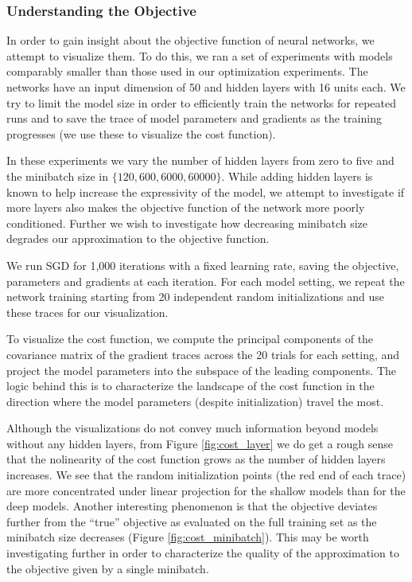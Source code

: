 \subsubsection*{Understanding the Objective}

In order to gain insight about the objective function of neural networks, we
attempt to visualize them. To do this, we ran a set of experiments with models
comparably smaller than those used in our optimization experiments.  The
networks have an input dimension of 50 and hidden layers with 16 units each. We
try to limit the model size in order to efficiently train the networks for
repeated runs and to save the trace of model parameters and gradients as the
training progresses (we use these to visualize the cost function).

In these experiments we vary the number of hidden layers from zero to five and
the minibatch size in $\{120,600,6000,60000\}$.  While adding hidden layers is
known to help increase the expressivity of the model, we attempt to investigate
if more layers also makes the objective function of the network more poorly
conditioned. Further we wish to investigate how decreasing minibatch size degrades
our approximation to the objective function.

We run SGD for 1,000 iterations with a fixed learning rate, saving the
objective, parameters and gradients at each iteration. For each model setting,
we repeat the network training starting from 20 independent random initializations and
use these traces for our visualization.

To visualize the cost function, we compute the principal components of the
covariance matrix of the gradient traces across the 20 trials for each setting,
and project the model parameters into the subspace of the leading components.
The logic behind this is to characterize the landscape of the cost function in
the direction where the model parameters (despite initialization) travel the
most. 

Although the visualizations do not convey much information beyond models
without any hidden layers, from Figure \ref{fig:cost_layer} we do get a rough
sense that the nolinearity of the cost function grows as the number of hidden
layers increases. We see that the random initialization points (the red end of
each trace) are more concentrated under linear projection for the shallow
models than for the deep models. Another interesting phenomenon is that the
objective deviates further from the ``true'' objective as evaluated on the full
training set as the minibatch size decreases (Figure \ref{fig:cost_minibatch}).
This may be worth investigating further in order to characterize the quality of
the approximation to the objective given by a single minibatch. 
